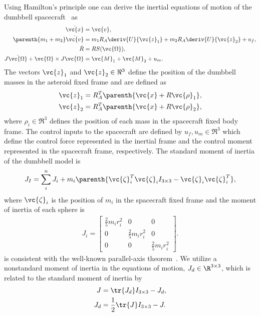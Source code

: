 \documentclass[smallextended]{svjour3}       %
\begin{document}
Using Hamilton's principle one can derive the inertial equations of motion of the dumbbell spacecraft~\cite{kulumani2017b} as
\begin{align}
    \dot{\vc{x}} &= \vc{v}, \label{eq:x_dot}\\
    \parenth{m_1 + m_2} \dot{\vc{v}} &= m_1 R_A \deriv{U}{\vc{z}_1} + m_2 R_A \deriv{U}{\vc{z}_2} + u_f,\label{eq:v_dot} \\
    \dot{R} &= R S(\vc{\Omega}) , \label{eq:R_dot}\\
    J \dot{\vc{\Omega}} + \vc{\Omega} \times J \vc{\Omega} &= \vc{M}_1 + \vc{M}_2 + u_m. \label{eq:omega_dot}
\end{align}
The vectors \( \vc{z}_1 \) and \( \vc{z}_2\in\Re^3\) define the position of the dumbbell masses in the asteroid fixed frame and are defined as
\begin{align}
    \vc{z}_1 &= R_A^T \parenth{\vc{x} + R \vc{\rho}_1} , \\
    \vc{z}_2 &= R_A^T \parenth{\vc{x} + R \vc{\rho}_2},
\end{align}
where \( \rho_i \in\Re^3 \) defines the position of each mass in the spacecraft fixed body frame.
The control inputs to the spacecraft are defined by \( u_f, u_m \in \Re^3 \) which define the control force represented in the inertial frame and the control moment represented in the spacecraft frame, respectively.
The standard moment of inertia of the dumbbell model is 
\begin{align}\label{eq:dumbbell_moment_of_inertia}
    J_I = \sum_i^n J_i + m_i \parenth{\vc{\zeta}_i^T \vc{\zeta}_i I_{3\times 3} - \vc{\zeta}_i \vc{\zeta}_i^T} , 
\end{align}
where \( \vc{\zeta}_i \) is the position of \( m_i \) in the spacecraft fixed frame and the moment of inertia of each sphere is
\begin{align}\label{eq:sphere_moment_of_inertia}
    J_i = \begin{bmatrix} 
        \frac{2}{5} m_i r_i^2 & 0 & 0 \\
        0 & \frac{2}{5} m_i r_i^2 & 0 \\
        0 & 0 & \frac{2}{5} m_i r_i^2 
    \end{bmatrix}.
\end{align}
 is consistent with the well-known parallel-axis theorem~\cite{greenwood1988}.
We utilize a nonstandard moment of inertia in the equations of motion, \( J_d \in \R^{3 \times 3 } \), which is related to the standard moment of inertia by
\begin{subequations}\label{eq:moi_transformation}
    \begin{align}
        J &= \tr{J_d} I_{3\times 3} - J_d, \label{eq:moi_ns2s}\\
        J_d &= \frac{1}{2} \tr{J} I_{3\times 3} - J.\label{eq:moi_s2ns}
    \end{align}
\end{subequations}     
\end{document}
